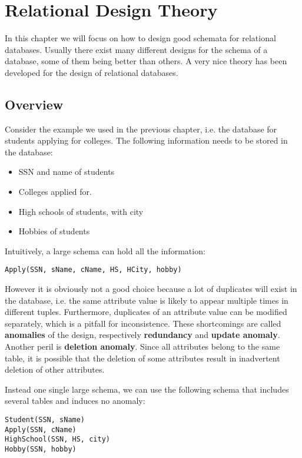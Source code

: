 \ifx\PREAMBLE\undefined


\fi
\chapter{Relational Design Theory}
In this chapter we will focus on how to design good schemata for relational databases. Usually there exist many different designs for the schema of a database, some of them being better than others. A very nice theory has been developed for the design of relational databases.
\section{Overview}
Consider the example we used in the previous chapter, i.e. the database for students applying for colleges. The following information needs to be stored in the database:
\begin{itemize}
\item SSN and name of students
\item Colleges applied for.
\item High schools of students, with city
\item Hobbies of students
\end{itemize}
Intuitively, a large schema can hold all the information:
\begin{lstlisting}
Apply(SSN, sName, cName, HS, HCity, hobby)
\end{lstlisting}
However it is obviously not a good choice because a lot of duplicates will exist in the database, i.e. the same attribute value is likely to appear multiple times in different tuples. Furthermore, duplicates of an attribute value can be modified separately, which is a pitfall for inconsistence. These shortcomings are called \textbf{anomalies} of the design, respectively \textbf{redundancy} and \textbf{update anomaly}. Another peril is \textbf{deletion anomaly}. Since all attributes belong to the same table, it is possible that the deletion of some attributes result in inadvertent deletion of other attributes.

Instead one single large schema, we can use the following schema that includes several tables and induces no anomaly:
\begin{lstlisting}
Student(SSN, sName)
Apply(SSN, cName)
HighSchool(SSN, HS, city)
Hobby(SSN, hobby)
\end{lstlisting}

